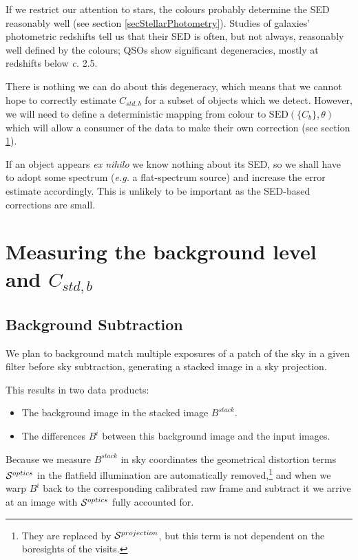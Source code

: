 \documentclass[12pt]{article}
\renewcommand{\c}{\textit{c.}\xspace}
\newcommand{\eg}{\textit{e.g.}\xspace}
\newcommand{\qe}{{\cal S}}
\begin{document}
If we restrict our attention to stars, the colours probably determine the SED reasonably well (see
section \ref{secStellarPhotometry}).  Studies of galaxies' photometric redshifts tell us that their SED is
often, but not always, reasonably well defined by the colours; QSOs show significant degeneracies, mostly
at redshifts below \c 2.5.

There is nothing we can do about this degeneracy, which means that we cannot hope to correctly estimate
$C_{std, b}$ for a subset of objects which we detect.  However, we will need to define a deterministic mapping
from colour to $\mbox{SED}(\{C_b\}, \theta)$ which will allow a consumer of the data to make their own
correction (see section \ref{secMeasuring}).

If an object appears \textit{ex nihilo} we know nothing about its SED, so we shall have to adopt
some spectrum (\eg a flat-spectrum source) and increase the error estimate accordingly.  This is unlikely
to be important as the SED-based corrections are small.

\section{Measuring the background level and \texorpdfstring{$C_{std, b}$}{Cstd}}
\label{secMeasuring}

\subsection{Background Subtraction}

We plan to background match multiple exposures of a patch of the sky in a given filter before sky subtraction,
generating a stacked image in a sky projection.

This results in two data products:
\begin{itemize}
\item The background image in the stacked image $B^{stack}$.
\item The differences $B^i$ between this background image and the input images.
\end{itemize}
Because we measure $B^{stack}$ in sky coordinates the geometrical distortion terms $\qe^{optics}$ in
the flatfield illumination are automatically removed,\footnote{They are replaced by $\qe^{projection}$,
  but this term is not dependent on the boresights of the visits.}
and when we warp $B^i$ back to the corresponding
calibrated raw frame and subtract it we arrive at an image with $\qe^{optics}$ fully accounted for.
\end{document}
